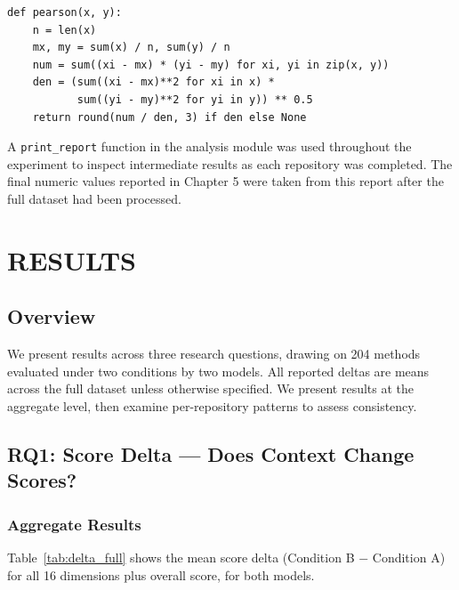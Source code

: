 \documentclass[12pt]{report}
\begin{document}
\begin{lstlisting}[caption={Pearson correlation implementation used in the analysis module.}, label={lst:pearson}]
def pearson(x, y):
    n = len(x)
    mx, my = sum(x) / n, sum(y) / n
    num = sum((xi - mx) * (yi - my) for xi, yi in zip(x, y))
    den = (sum((xi - mx)**2 for xi in x) *
           sum((yi - my)**2 for yi in y)) ** 0.5
    return round(num / den, 3) if den else None
\end{lstlisting}

A \texttt{print\_report} function in the analysis module was used throughout the experiment to inspect intermediate results as each repository was completed. The final numeric values reported in Chapter 5 were taken from this report after the full dataset had been processed.

\chapter{RESULTS}

\section{Overview}

We present results across three research questions, drawing on 204 methods evaluated under two conditions by two models. All reported deltas are means across the full dataset unless otherwise specified. We present results at the aggregate level, then examine per-repository patterns to assess consistency.

\section{RQ1: Score Delta --- Does Context Change Scores?}

\subsection{Aggregate Results}

Table~\ref{tab:delta_full} shows the mean score delta (Condition B $-$ Condition A) for all 16 dimensions plus overall score, for both models.
\end{document}
